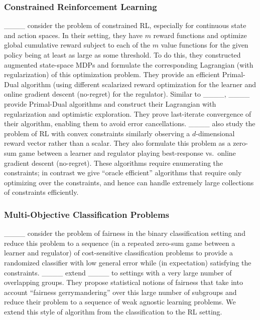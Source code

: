 \subsubsection{Constrained Reinforcement Learning}
____ consider the problem of constrained RL, especially for continuous state and action spaces. In their setting, they have $m$ reward functions and optimize global cumulative reward subject to each of the $m$ value functions for the given policy being at least as large as some threshold. To do this, they constructed augmented state-space MDPs and formulate the corresponding Lagrangian (with regularization) of this optimization problem. They provide an efficient Primal-Dual algorithm (using different scalarized reward optimization for the learner and online gradient descent (no-regret) for the regulator).  Similar to ____, ____ provide Primal-Dual algorithms and construct their Lagrangian with regularization and optimistic exploration. They prove last-iterate convergence of their algorithm, enabling them to avoid error cancellations. 
____ also study the problem of RL with convex constraints similarly observing a $d$-dimensional reward vector rather than a scalar. They also formulate this problem as a zero-sum game between a learner and regulator playing best-response vs.~online gradient descent (no-regret). These algorithms require enumerating the constraints; in contrast we give ``oracle efficient'' algorithms that require only optimizing over the constraints, and hence can handle extremely large collections of constraints efficiently.
\subsubsection{Multi-Objective Classification Problems}
____ consider the problem of fairness in the binary classification setting and reduce this problem to a sequence (in a repeated zero-sum game between a learner and regulator) of cost-sensitive classification problems to provide a randomized classifier with low general error while (in expectation) satisfying the constraints. ____ extend ____ to settings with a very large number  of overlapping groups. They propose statistical notions of fairness that take into account ``fairness gerrymandering'' over this large number of subgroups and reduce their problem to a sequence of weak agnostic learning problems. We extend this style of algorithm from the classification to the RL setting.